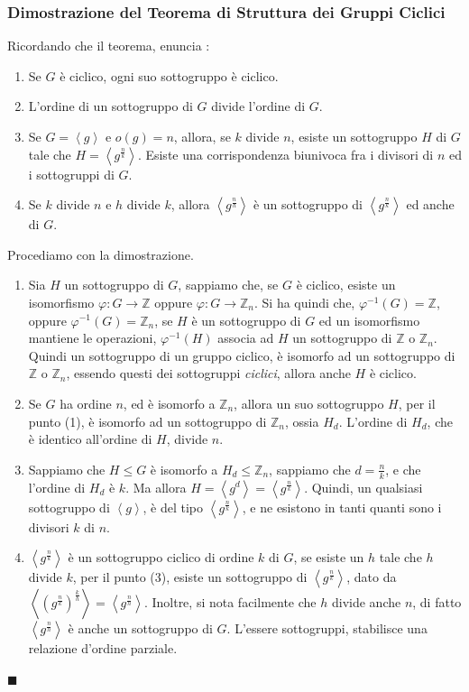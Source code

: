 \documentclass[12pt, letterpaper]{article}
\newcommand{\Z}{{\mathbb Z}}
\begin{document}
\subsubsection{Dimostrazione del Teorema di Struttura dei Gruppi Ciclici}\label{dimStrutCicl}
Ricordando che il teorema, enuncia  : \begin{enumerate}
    \item Se \(G\) è ciclico, ogni suo sottogruppo è ciclico.
    \item L'ordine di un sottogruppo di \(G\) divide l'ordine di \(G\).
    \item Se \(G=\left\langle g\right\rangle\) e \(o(g)=n\), allora, se \(k\) divide \(n\), esiste un sottogruppo \(H\)
    di \(G\) tale che \(H=\left\langle g^{\frac{n}{k}}\right\rangle\). Esiste una corrispondenza biunivoca fra i divisori di 
    \(n\) ed i sottogruppi di \(G\).
    \item Se \(k\) divide \(n\) e \(h\) divide \(k\), allora \(\left\langle g^{\frac{n}{h}}\right\rangle\) è un sottogruppo 
    di \(\left\langle g^{\frac{n}{k}}\right\rangle\) ed anche di \(G\).
\end{enumerate}
Procediamo con la dimostrazione. \begin{enumerate}
    \item Sia \(H\) un sottogruppo di \(G\), sappiamo che, se \(G\) è ciclico, esiste un isomorfismo 
    \(\varphi :G\rightarrow \Z\) oppure  \(\varphi :G\rightarrow \Z_n\). Si ha quindi che, 
    \(\varphi^{-1}(G)=\Z\), oppure   \(\varphi^{-1}(G)=\Z_n\), se \(H\) è un sottogruppo di \(G\) ed un isomorfismo 
    mantiene le operazioni, \(\varphi^{-1}(H)\) associa ad \(H\) un sottogruppo di \(\Z\) o \(\Z_n\). Quindi un sottogruppo 
    di un gruppo ciclico, è isomorfo ad un sottogruppo di \(\Z\) o \(\Z_n\), essendo questi dei sottogruppi \textit{ciclici},
    allora anche \(H\) è ciclico.
    \item Se \(G\) ha ordine \(n\), ed è isomorfo a \(\Z_n\), allora un suo sottogruppo \(H\), per il punto (1), è isomorfo 
    ad un sottogruppo di \(\Z_n\), ossia \(H_d\). L'ordine di \(H_d\), che è identico all'ordine di \(H\), divide \(n\).
    \item Sappiamo che \(H\le G\) è isomorfo a \(H_d\le\Z_n\), sappiamo che \(d=\frac{n}{k}\), e che l'ordine di 
    \(H_d\) è \(k\). Ma allora \(H=\left\langle g^{d}\right\rangle=\left\langle g^{\frac{n}{k}}\right\rangle\). Quindi, un 
    qualsiasi sottogruppo di \(\left\langle g\right\rangle\), è del tipo \(\left\langle g^{\frac{n}{k}}\right\rangle\), e ne esistono 
    in tanti quanti sono i divisori \(k\) di \(n\).
    \item \(\left\langle g^{\frac{n}{k}}\right\rangle\) è un sottogruppo ciclico di ordine \(k\) di \(G\), se esiste un 
    \(h\) tale che \(h\) divide \(k\), per il punto (3), esiste un sottogruppo di \(\left\langle g^{\frac{n}{k}}\right\rangle\), 
    dato da \(\left\langle (g^{\frac{n}{k}})^{\frac{k}{h}}\right\rangle=\left\langle g^{\frac{n}{h}}\right\rangle\). Inoltre, 
    si nota facilmente che \(h\) divide anche \(n\), di fatto \(\left\langle g^{\frac{n}{h}}\right\rangle\) è anche un sottogruppo 
    di \(G\). L'essere sottogruppi, stabilisce una relazione d'ordine parziale.
\end{enumerate}
\raggedleft\(\blacksquare\)\\
\raggedright

 
\end{document}

